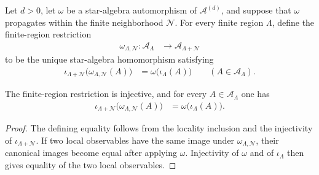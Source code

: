 \begin{definition}
    \label{def:qca_finite_region_restriction}
    \leanok
    Let $d>0$, let $\omega$ be a star-algebra automorphism of
    $\mathcal A^{(d)}$, and suppose that $\omega$ propagates within the finite
    neighborhood $\mathcal N$.  For every finite region $\Lambda$, define
    the finite-region restriction
    \begin{align}
        \omega_{\Lambda,\mathcal N}\colon\mathcal A_\Lambda
         & \longrightarrow\mathcal A_{\Lambda+\mathcal N}
    \end{align}
    to be the unique star-algebra homomorphism satisfying
    \begin{align}
        \iota_{\Lambda+\mathcal N}
        \bigl(\omega_{\Lambda,\mathcal N}(A)\bigr)
         & =\omega\bigl(\iota_\Lambda(A)\bigr)
        \qquad(A\in\mathcal A_\Lambda).
    \end{align}
\end{definition}

\begin{lemma}
    \label{thm:qca_finite_region_restriction_embedding}
    \leanok
    The finite-region restriction is injective, and for every
    $A\in\mathcal A_\Lambda$ one has
    \begin{align}
        \iota_{\Lambda+\mathcal N}
        \bigl(\omega_{\Lambda,\mathcal N}(A)\bigr)
         & =\omega\bigl(\iota_\Lambda(A)\bigr).
    \end{align}
\end{lemma}

\begin{proof}\leanok
    The defining equality follows from the locality inclusion and the
    injectivity of $\iota_{\Lambda+\mathcal N}$.  If two local observables
    have the same image under $\omega_{\Lambda,\mathcal N}$, their canonical
    images become equal after applying $\omega$.  Injectivity of $\omega$ and
    of $\iota_\Lambda$ then gives equality of the two local observables.
\end{proof}

